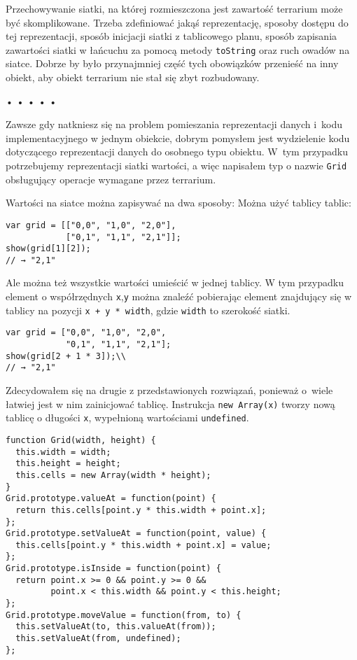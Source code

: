   
Przechowywanie siatki, na której rozmieszczona jest zawartość terrarium może być skomplikowane. Trzeba zdefiniować jakąś reprezentację, sposoby dostępu do tej reprezentacji, sposób inicjacji siatki z tablicowego planu, sposób zapisania zawartości siatki w łańcuchu za pomocą metody \texttt{toString} oraz ruch owadów na siatce. Dobrze by było przynajmniej część tych obowiązków przenieść na inny obiekt, aby obiekt terrarium nie stał się zbyt rozbudowany.



\begin{center}
• • • • •
\end{center}

  
Zawsze gdy natkniesz się na problem pomieszania reprezentacji danych i~kodu implementacyjnego w jednym obiekcie, dobrym pomysłem jest wydzielenie kodu dotyczącego reprezentacji danych do osobnego typu obiektu. W~tym przypadku potrzebujemy reprezentacji siatki wartości, a więc napisałem typ o nazwie \texttt{Grid} obsługujący operacje wymagane przez terrarium.

  
Wartości na siatce można zapisywać na dwa sposoby: Można użyć tablicy tablic:

  
\begin{verbatim} 
var grid = [["0,0", "1,0", "2,0"],
            ["0,1", "1,1", "2,1"]];
show(grid[1][2]);
// → "2,1"
\end{verbatim}
  
Ale można też wszystkie wartości umieścić w jednej tablicy. W tym przypadku element o współrzędnych \texttt{x},\texttt{y} można znaleźć pobierając element znajdujący się w tablicy na pozycji \texttt{x + y * width}, gdzie \texttt{width} to szerokość siatki.

  
\begin{verbatim} 
var grid = ["0,0", "1,0", "2,0",
            "0,1", "1,1", "2,1"];
show(grid[2 + 1 * 3]);\\
// → "2,1"
\end{verbatim}
  
Zdecydowałem się na drugie z przedstawionych rozwiązań, ponieważ o~wiele łatwiej jest w nim zainicjować tablicę. Instrukcja \texttt{new Array(x)} tworzy nową tablicę o długości \texttt{x}, wypełnioną wartościami \texttt{undefined}.

  
\begin{verbatim} 
function Grid(width, height) {
  this.width = width;
  this.height = height;
  this.cells = new Array(width * height);
}
Grid.prototype.valueAt = function(point) {
  return this.cells[point.y * this.width + point.x];
};
Grid.prototype.setValueAt = function(point, value) {
  this.cells[point.y * this.width + point.x] = value;
};
Grid.prototype.isInside = function(point) {
  return point.x >= 0 && point.y >= 0 &&
         point.x < this.width && point.y < this.height;
};
Grid.prototype.moveValue = function(from, to) {
  this.setValueAt(to, this.valueAt(from));
  this.setValueAt(from, undefined);
};
 \end{verbatim}



